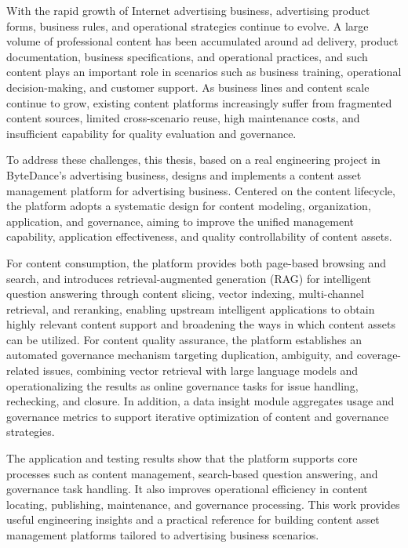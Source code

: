 \begin{englishabstract}
With the rapid growth of Internet advertising business, advertising product forms, business rules, and operational strategies continue to evolve. A large volume of professional content has been accumulated around ad delivery, product documentation, business specifications, and operational practices, and such content plays an important role in scenarios such as business training, operational decision-making, and customer support. As business lines and content scale continue to grow, existing content platforms increasingly suffer from fragmented content sources, limited cross-scenario reuse, high maintenance costs, and insufficient capability for quality evaluation and governance.

To address these challenges, this thesis, based on a real engineering project in ByteDance's advertising business, designs and implements a content asset management platform for advertising business. Centered on the content lifecycle, the platform adopts a systematic design for content modeling, organization, application, and governance, aiming to improve the unified management capability, application effectiveness, and quality controllability of content assets.

For content consumption, the platform provides both page-based browsing and search, and introduces retrieval-augmented generation (RAG) for intelligent question answering through content slicing, vector indexing, multi-channel retrieval, and reranking, enabling upstream intelligent applications to obtain highly relevant content support and broadening the ways in which content assets can be utilized. For content quality assurance, the platform establishes an automated governance mechanism targeting duplication, ambiguity, and coverage-related issues, combining vector retrieval with large language models and operationalizing the results as online governance tasks for issue handling, rechecking, and closure. In addition, a data insight module aggregates usage and governance metrics to support iterative optimization of content and governance strategies.

The application and testing results show that the platform supports core processes such as content management, search-based question answering, and governance task handling. It also improves operational efficiency in content locating, publishing, maintenance, and governance processing. This work provides useful engineering insights and a practical reference for building content asset management platforms tailored to advertising business scenarios.

\end{englishabstract}
